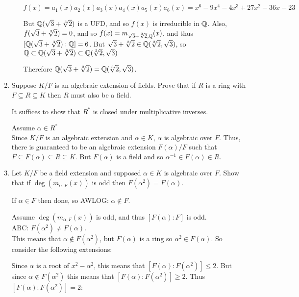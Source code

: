 \documentclass[letterpaper,12pt,fleqn]{article}
\renewcommand{\a}{\alpha}
\begin{document}
\begin{enumerate}
\begin{enumerate}
    $f(x)=a_1(x)a_2(x)a_3(x)a_4(x)a_5(x)a_6(x)=x^6-9x^4-4x^3+27x^2-36x-23$

    But $\mathbb{Q}(\sqrt{3}+\sqrt[3]{2})$ is a UFD, and so $f(x)$ is irreducible in $\mathbb{Q}$. Also, $f(\sqrt{3}+\sqrt[3]{2})=0$,
    and so $f(x)=m_{\sqrt{3}+\sqrt[3]{2},\mathbb{Q}}(x)$, and thus $[\mathbb{Q}(\sqrt{3}+\sqrt[3]{2}):\mathbb{Q}]=6$. But $\sqrt{3}+\sqrt[3]{2}\in\mathbb{Q}(\sqrt[3]{2},\sqrt{3})$, so
    $\mathbb{Q}\subset\mathbb{Q}(\sqrt{3}+\sqrt[3]{2})\subset\mathbb{Q}(\sqrt[3]{2},\sqrt{3})$

    Therefore $\mathbb{Q}(\sqrt{3}+\sqrt[3]{2})=\mathbb{Q}(\sqrt[3]{2},\sqrt{3})$.
  \end{enumerate}

  \bigskip

\item Suppose $K/F$ is an algebraic extension of fields. Prove that if $R$ is a ring
  with $F\subseteq R\subseteq K$ then $R$ must also be a field.

  It suffices to show that $R^*$ is closed under multiplicative inverses.
  
  Assume $\a\in R^*$ \\
  Since $K/F$ is an algebraic extension and $\a\in K$, $\a$ is algebraic over $F$.
  Thus, there is guaranteed to be an algebraic extension $F(\a)/F$ such that
  $F\subseteq F(\a)\subseteq R\subseteq K$. But $F(\a)$ is a field and so
  $\a^{-1}\in F(\a)\in R$.

  \bigskip

\item Let $K/F$ be a field extension and supposed $\a\in K$ is algebraic over $F$.
  Show that if $\deg(m_{\a,F}(x))$ is odd then $F(\a^2)=F(\a)$.

  If $\a\in F$ then done, so AWLOG: $\a\notin F$.

  Assume $\deg(m_{\a,F}(x))$ is odd, and thus $[F(\a):F]$ is odd. \\
  ABC: $F(\a^2)\ne F(\a)$. \\
  This means that $\a\notin F(\a^2)$, but $F(\a)$ is a ring so $\a^2\in F(\a)$. So
  consider the following extensions:


  Since $\a$ is a root of $x^2-\a^2$, this means that $[F(\a):F(\a^2)]\le2$. But since
  $\a\notin F(\a^2)$ this means that $[F(\a):F(\a^2)]\ge2$. Thus
  $[F(\a):F(\a^2)]=2$:



\end{enumerate}
\end{document}
